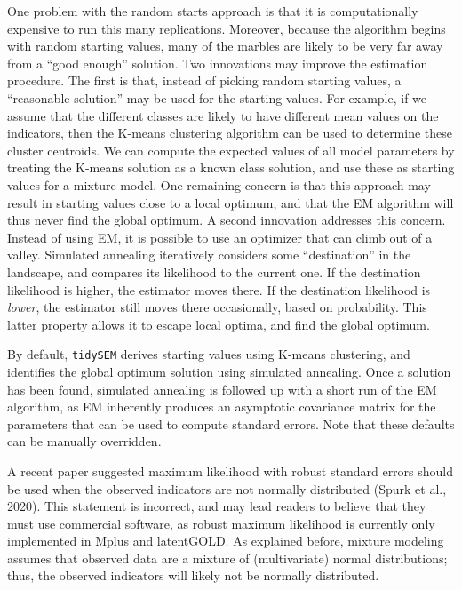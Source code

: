 \documentclass[
  ,man,floatsintext]{apa6}
\begin{document}
One problem with the random starts approach is that
it is computationally expensive to run this many replications.
Moreover, because the algorithm begins with random starting values,
many of the marbles are likely to be very far away from a ``good enough'' solution.
Two innovations may improve the estimation procedure.
The first is that, instead of picking random starting values,
a ``reasonable solution'' may be used for the starting values.
For example, if we assume that the different classes are likely to have
different mean values on the indicators,
then the K-means clustering algorithm can be used to
determine these cluster centroids.
We can compute the expected values of all model parameters
by treating the K-means solution as a known class solution,
and use these as starting values for a mixture model.
One remaining concern is that this approach may result
in starting values close to a local optimum,
and that the EM algorithm will thus never find the global optimum.
A second innovation addresses this concern.
Instead of using EM,
it is possible to use an optimizer that can climb out of a valley.
Simulated annealing iteratively considers some ``destination'' in the landscape,
and compares its likelihood to the current one.
If the destination likelihood is higher,
the estimator moves there.
If the destination likelihood is \emph{lower},
the estimator still moves there occasionally,
based on probability.
This latter property allows it to escape local optima,
and find the global optimum.

By default, \texttt{tidySEM} derives starting values using K-means clustering,
and identifies the global optimum solution using simulated annealing.
Once a solution has been found,
simulated annealing is followed up with a short run of the EM algorithm,
as EM inherently produces an asymptotic covariance matrix for
the parameters that can be used to compute standard errors.
Note that these defaults can be manually overridden.

A recent paper suggested maximum likelihood with robust standard errors
should be used when the observed indicators are not normally distributed (Spurk et al., 2020).
This statement is incorrect, and may lead readers to believe that
they must use commercial software,
as robust maximum likelihood is currently only implemented
in Mplus and latentGOLD.
As explained before,
mixture modeling assumes that observed data are
a mixture of (multivariate) normal distributions;
thus, the observed indicators will likely not be normally distributed.
\end{document}
